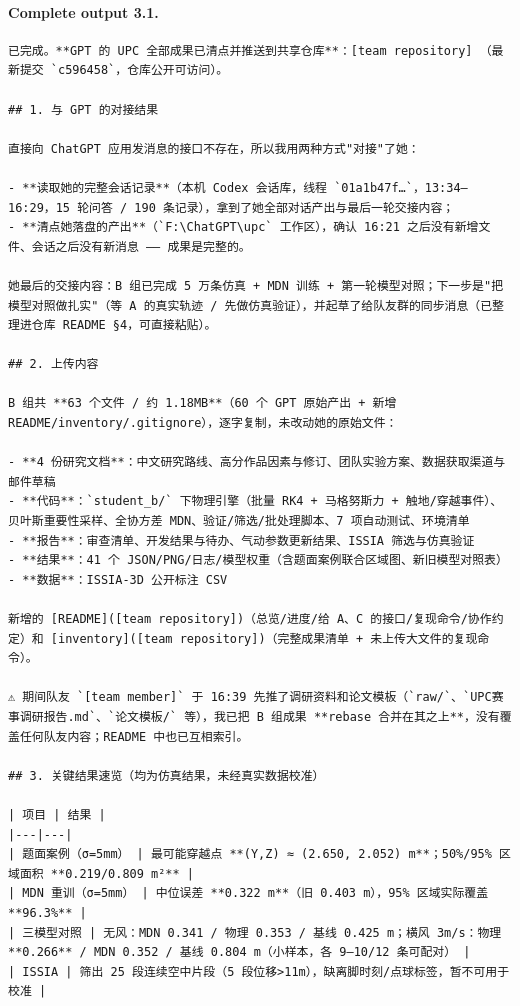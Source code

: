 \documentclass[UTF8,10pt]{ctexart}
\begin{document}
\paragraph{Complete output 3.1.}
\begin{Verbatim}[breaklines=true,breakanywhere=true,fontsize=\scriptsize,frame=single,framesep=2pt]
已完成。**GPT 的 UPC 全部成果已清点并推送到共享仓库**：[team repository] （最新提交 `c596458`，仓库公开可访问）。

## 1. 与 GPT 的对接结果

直接向 ChatGPT 应用发消息的接口不存在，所以我用两种方式"对接"了她：

- **读取她的完整会话记录**（本机 Codex 会话库，线程 `01a1b47f…`，13:34–16:29，15 轮问答 / 190 条记录），拿到了她全部对话产出与最后一轮交接内容；
- **清点她落盘的产出**（`F:\ChatGPT\upc` 工作区），确认 16:21 之后没有新增文件、会话之后没有新消息 —— 成果是完整的。

她最后的交接内容：B 组已完成 5 万条仿真 + MDN 训练 + 第一轮模型对照；下一步是"把模型对照做扎实"（等 A 的真实轨迹 / 先做仿真验证），并起草了给队友群的同步消息（已整理进仓库 README §4，可直接粘贴）。

## 2. 上传内容

B 组共 **63 个文件 / 约 1.18MB**（60 个 GPT 原始产出 + 新增 README/inventory/.gitignore），逐字复制，未改动她的原始文件：

- **4 份研究文档**：中文研究路线、高分作品因素与修订、团队实验方案、数据获取渠道与邮件草稿
- **代码**：`student_b/` 下物理引擎（批量 RK4 + 马格努斯力 + 触地/穿越事件）、贝叶斯重要性采样、全协方差 MDN、验证/筛选/批处理脚本、7 项自动测试、环境清单
- **报告**：审查清单、开发结果与待办、气动参数更新结果、ISSIA 筛选与仿真验证
- **结果**：41 个 JSON/PNG/日志/模型权重（含题面案例联合区域图、新旧模型对照表）
- **数据**：ISSIA-3D 公开标注 CSV

新增的 [README]([team repository])（总览/进度/给 A、C 的接口/复现命令/协作约定）和 [inventory]([team repository])（完整成果清单 + 未上传大文件的复现命令）。

⚠ 期间队友 `[team member]` 于 16:39 先推了调研资料和论文模板（`raw/`、`UPC赛事调研报告.md`、`论文模板/` 等），我已把 B 组成果 **rebase 合并在其之上**，没有覆盖任何队友内容；README 中也已互相索引。

## 3. 关键结果速览（均为仿真结果，未经真实数据校准）

| 项目 | 结果 |
|---|---|
| 题面案例（σ=5mm） | 最可能穿越点 **(Y,Z) ≈ (2.650, 2.052) m**；50%/95% 区域面积 **0.219/0.809 m²** |
| MDN 重训（σ=5mm） | 中位误差 **0.322 m**（旧 0.403 m），95% 区域实际覆盖 **96.3%** |
| 三模型对照 | 无风：MDN 0.341 / 物理 0.353 / 基线 0.425 m；横风 3m/s：物理 **0.266** / MDN 0.352 / 基线 0.804 m（小样本，各 9–10/12 条可配对） |
| ISSIA | 筛出 25 段连续空中片段（5 段位移>11m），缺离脚时刻/点球标签，暂不可用于校准 |


\end{Verbatim}
\end{document}
